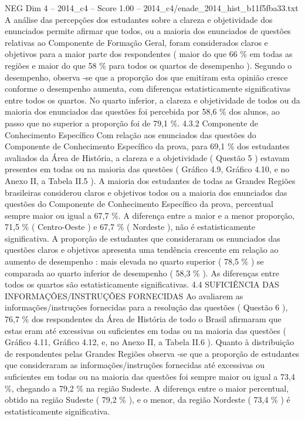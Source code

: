 \begin{textsample}{NEG Dim 4 – 2014\_c4 – Score 1.00 – 2014\_c4/enade\_2014\_hist\_b11f5fba33.txt}
A análise das percepções dos estudantes sobre a clareza e objetividade dos enunciados permite afirmar que todos, ou a maioria dos enunciados de questões relativas ao Componente de Formação Geral, foram considerados claros e objetivos para a maior parte dos respondentes ( maior do que 66 \% em todas as regiões e maior do que 58 \% para todos os quartos de desempenho ).
Segundo o desempenho, observa -se que a proporção dos que emitiram esta opinião cresce conforme o desempenho aumenta, com diferenças estatisticamente significativas entre todos os quartos.
No quarto inferior, a clareza e objetividade de todos ou da maioria dos enunciados das questões foi percebida por 58,6 \% dos alunos, ao passo que no superior a proporção foi de 79,1 \%. 4.3.2 Componente de Conhecimento Específico Com relação aos enunciados das questões do Componente de Conhecimento Específico da prova, para 69,1 \% dos estudantes avaliados da Área de História, a clareza e a objetividade ( Questão 5 ) estavam presentes em todas ou na maioria das questões ( Gráfico 4.9, Gráfico 4.10, e no Anexo II, a Tabela II.5 ).
A maioria dos estudantes de todas as Grandes Regiões brasileiras considerou claros e objetivos todos ou a maioria dos enunciados das questões do Componente de Conhecimento Específico da prova, percentual sempre maior ou igual a 67,7 \%.
A diferença entre a maior e a menor proporção, 71,5 \% ( Centro-Oeste ) e 67,7 \% ( Nordeste ), não é estatisticamente significativa.
A proporção de estudantes que consideraram os enunciados das questões claros e objetivos apresenta uma tendência crescente em relação ao aumento de desempenho : mais elevada no quarto superior ( 78,5 \% ) se comparada ao quarto inferior de desempenho ( 58,3 \% ).
As diferenças entre todos os quartos são estatisticamente significativas. 4.4 SUFICIÊNCIA DAS INFORMAÇÕES/INSTRUÇÕES FORNECIDAS Ao avaliarem as informações/instruções fornecidas para a resolução das questões ( Questão 6 ), 76,7 \% dos respondentes da Área de História de todo o Brasil afirmaram que estas eram até excessivas ou suficientes em todas ou na maioria das questões ( Gráfico 4.11, Gráfico 4.12, e, no Anexo II, a Tabela II.6 ).
Quanto à distribuição de respondentes pelas Grandes Regiões observa -se que a proporção de estudantes que consideraram as informações/instruções fornecidas até excessivas ou suficientes em todas ou na maioria das questões foi sempre maior ou igual a 73,4 \%, chegando a 79,2 \% na região Sudeste.
A diferença entre o maior percentual, obtido na região Sudeste ( 79,2 \% ), e o menor, da região Nordeste ( 73,4 \% ) é estatisticamente significativa.

\end{textsample}

